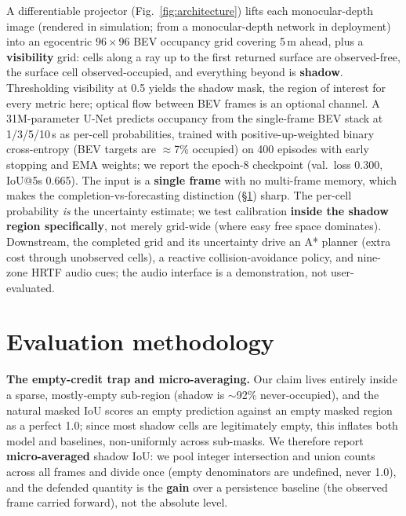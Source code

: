 \documentclass{article}
\begin{document}
A differentiable projector (Fig.~\ref{fig:architecture}) lifts each monocular-depth image
(rendered in simulation; from a monocular-depth network in deployment)
into an egocentric $96\times96$ BEV occupancy grid covering 5\,m ahead, plus a
\textbf{visibility} grid: cells along a ray up to the first returned surface are observed-free,
the surface cell observed-occupied, and everything beyond is \textbf{shadow}. Thresholding
visibility at 0.5 yields the shadow mask, the region of interest for every metric here;
optical flow between BEV frames is an optional channel. A
31M-parameter U-Net predicts occupancy from the single-frame BEV stack at 1/3/5/10\,s as
per-cell probabilities, trained with positive-up-weighted binary cross-entropy (BEV targets are
$\approx$7\% occupied) on 400 episodes with early stopping and EMA weights; we report the
epoch-8 checkpoint (val.\ loss 0.300, IoU@5s 0.665). The input is a \textbf{single frame} with
no multi-frame memory, which makes the completion-vs-forecasting distinction
(\S\ref{sec:methodology}) sharp. The per-cell probability \emph{is} the uncertainty estimate; we
test calibration \textbf{inside the shadow region specifically}, not merely grid-wide (where
easy free space dominates). Downstream, the completed grid and its
uncertainty drive an A* planner (extra cost through unobserved cells), a reactive
collision-avoidance policy, and nine-zone HRTF audio cues; the audio interface is a
demonstration, not user-evaluated.

\section{Evaluation methodology}
\label{sec:methodology}

\textbf{The empty-credit trap and micro-averaging.} Our claim lives entirely inside a sparse,
mostly-empty sub-region (shadow is ${\sim}$92\% never-occupied), and the natural masked IoU
scores an empty prediction against an empty masked region as a perfect 1.0; since most shadow
cells are legitimately empty, this inflates both model and baselines, non-uniformly across
sub-masks. We therefore report \textbf{micro-averaged} shadow IoU: we pool integer intersection
and union counts across all frames and divide once (empty denominators are undefined, never 1.0),
and the defended quantity is the \textbf{gain} over a persistence baseline (the observed frame
carried forward), not the absolute level.
\end{document}
